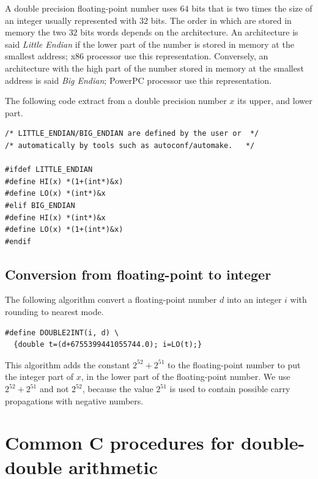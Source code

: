 A double precision floating-point number uses $64$ bits that is two
times the size of an integer usually represented with $32$ bits. The
order in which are stored in memory the two $32$ bits words depends on
the architecture. An architecture is said \emph{Little Endian} if the
lower part of the number is stored in memory at the smallest address;
x86 processor use this representation. Conversely, an architecture
with the high part of the number stored in memory at the smallest
address is said \emph{Big Endian}; PowerPC processor use this
representation.


The following code extract from a double precision number $x$ its
upper, and lower part.

\begin{lstlisting}[label={chap0:lst:endian},
  caption={Extract upper and lower part of a double precision number $x$},firstnumber=1]
/* LITTLE_ENDIAN/BIG_ENDIAN are defined by the user or  */
/* automatically by tools such as autoconf/automake.   */

#ifdef LITTLE_ENDIAN
#define HI(x) *(1+(int*)&x)
#define LO(x) *(int*)&x
#elif BIG_ENDIAN
#define HI(x) *(int*)&x
#define LO(x) *(1+(int*)&x)
#endif
\end{lstlisting}



\subsection{Conversion from floating-point to integer}

\begin{theorem}
  The following algorithm convert a floating-point number $d$ into an
  integer $i$ with rounding to nearest mode.

\begin{lstlisting}[label={chap0:lst:conversion2},caption={Solution 2},firstnumber=1]
#define DOUBLE2INT(i, d) \
  {double t=(d+6755399441055744.0); i=LO(t);}
\end{lstlisting}
\end{theorem}
This algorithm adds the constant $2^{52}+2^{51}$ to the floating-point
number to put the integer part of $x$, in the lower part of the
floating-point number.  We use $2^{52}+2^{51}$ and not $2^{52}$,
because the value $2^{51}$ is used to contain possible carry
propagations with negative numbers.



\section{Common C procedures for double-double arithmetic\label{section:commonCdoubledouble}}

